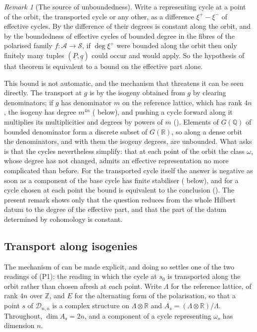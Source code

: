 \documentclass[11pt,reqno]{amsart}
\theoremstyle{plain}
\theoremstyle{definition}
\theoremstyle{remark}
\newtheorem{remark}[theorem]{Remark}
\newcommand{\QQ}{\mathbb{Q}}
\newcommand{\ZZ}{\mathbb{Z}}
\newcommand{\RR}{\mathbb{R}}
\newcommand{\cA}{\mathcal{A}}
\newcommand{\cD}{\mathcal{D}}
\newcommand{\cS}{\mathcal{S}}
\begin{document}
\begin{remark}[The source of unboundedness]
\label{rem:whereunbounded}
Write a representing cycle at a point of the orbit, the transported cycle or
any other, as a difference $\xi^{+}-\xi^{-}$ of effective cycles. By
 the difference of their degrees is constant along
the orbit, and by the boundedness of effective cycles of bounded degree in
the fibres of the polarised family $f\colon\cA\to\cS$, if $\deg\xi^{+}$ were
bounded along the orbit then only finitely many tuples
$(\underline{P},\underline{q})$ could occur and  would
apply. So the hypothesis of that theorem is equivalent to a bound on the
effective part alone.

This bound is not automatic, and the mechanism that threatens it can be seen
directly. The transport at $g$ is by the isogeny obtained from $g$ by
clearing denominators; if $g$ has denominator $m$ on the reference lattice,
which has rank $4n$, the isogeny has degree $m^{4n}$ (
below), and pushing a cycle forward along it multiplies its multiplicities
and degrees by powers of $m$ (). Elements of $G(\QQ)$ of bounded denominator form a discrete subset of
$G(\RR)$, so along a dense orbit the denominators, and with them the isogeny
degrees, are unbounded. What  asks is that the cycles
nevertheless simplify: that at each point of the orbit the class $\omega$,
whose degree has not changed, admits an effective representation no more
complicated than before. For the transported cycle itself the answer is
negative as soon as a component of the base cycle has finite stabiliser
( below), and for a cycle chosen at each point the bound
is equivalent to the conclusion (). The present remark
shows only that the question reduces from the whole Hilbert datum to the
degree of the effective part, and that the part of the datum determined by
cohomology is constant.
\end{remark}

\subsection{Transport along isogenies}

The mechanism of  can be made explicit, and doing
so settles one of the two readings of \textup{(P1)}: the reading in
which the cycle at $s_{0}$ is transported along the orbit rather than chosen
afresh at each point. Write $\Lambda$ for the reference lattice, of rank $4n$
over $\ZZ$, and $E$ for the alternating form of the polarisation, so that a
point $s$ of $\cD_{n,n}$ is a complex structure on $\Lambda\otimes\RR$ and
$A_{s}=(\Lambda\otimes\RR)/\Lambda$. Throughout, $\dim A_{s}=2n$, and a
component of a cycle representing $\omega_{s}$ has dimension $n$.
\end{document}
